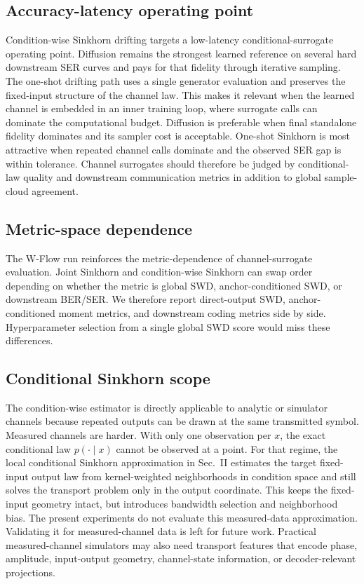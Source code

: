 \documentclass[10pt,journal]{IEEEtran}
\begin{document}
\subsection{Accuracy-latency operating point}
Condition-wise Sinkhorn drifting targets a low-latency conditional-surrogate operating point.
Diffusion remains the strongest learned reference on several hard downstream SER curves and pays for that fidelity through iterative sampling.
The one-shot drifting path uses a single generator evaluation and preserves the fixed-input structure of the channel law.
This makes it relevant when the learned channel is embedded in an inner training loop, where surrogate calls can dominate the computational budget.
Diffusion is preferable when final standalone fidelity dominates and its sampler cost is acceptable.
One-shot Sinkhorn is most attractive when repeated channel calls dominate and the observed SER gap is within tolerance.
Channel surrogates should therefore be judged by conditional-law quality and downstream communication metrics in addition to global sample-cloud agreement.

\subsection{Metric-space dependence}
The W-Flow run reinforces the metric-dependence of channel-surrogate evaluation.
Joint Sinkhorn and condition-wise Sinkhorn can swap order depending on whether the metric is global SWD, anchor-conditioned SWD, or downstream BER/SER\@.
We therefore report direct-output SWD, anchor-conditioned moment metrics, and downstream coding metrics side by side.
Hyperparameter selection from a single global SWD score would miss these differences.

\subsection{Conditional Sinkhorn scope}
The condition-wise estimator is directly applicable to analytic or simulator channels because repeated outputs can be drawn at the same transmitted symbol.
Measured channels are harder.
With only one observation per \(x\), the exact conditional law \(p(\cdot\mid x)\) cannot be observed at a point.
For that regime, the local conditional Sinkhorn approximation in Sec.~II estimates the target fixed-input output law from kernel-weighted neighborhoods in condition space and still solves the transport problem only in the output coordinate.
This keeps the fixed-input geometry intact, but introduces bandwidth selection and neighborhood bias.
The present experiments do not evaluate this measured-data approximation.
Validating it for measured-channel data is left for future work.
Practical measured-channel simulators may also need transport features that encode phase, amplitude, input-output geometry, channel-state information, or decoder-relevant projections.
\end{document}
